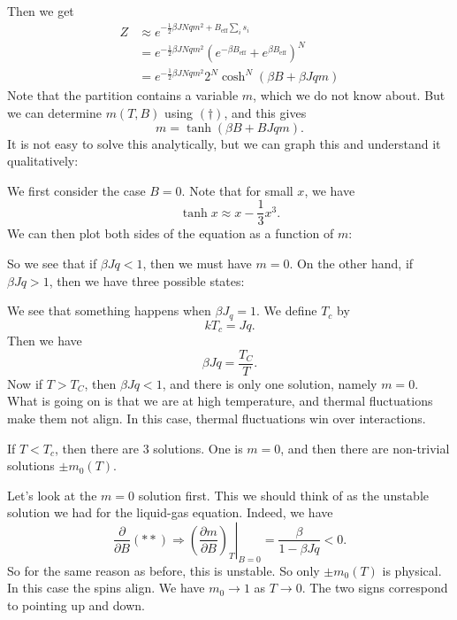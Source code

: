 \documentclass[a4paper]{article}
\begin{document}
Then we get
\begin{align*}
  Z &\approx e^{-\frac{1}{2} \beta J N q m^2 + B_{\mathrm{eff}}\sum_i s_i}\\
  &= e^{-\frac{1}{2} \beta J N q m^2} \left(e^{-\beta B_{\mathrm{eff}}} + e^{\beta B_{\mathrm{eff}}}\right)^N\\
  &= e^{-\frac{1}{2} \beta J N q m^2} 2^N \cosh^N (\beta B + \beta Jqm)
\end{align*}
Note that the partition contains a variable $m$, which we do not know about. But we can determine $m(T, B)$ using $(\dagger)$, and this gives
\[
  m = \tanh (\beta B + B Jqm).\tag{$**$}
\]
It is not easy to solve this analytically, but we can graph this and understand it qualitatively:

We first consider the case $B = 0$. Note that for small $x$, we have
\[
  \tanh x \approx x - \frac{1}{3} x^3.
\]
We can then plot both sides of the equation as a function of $m$:


So we see that if $\beta J q < 1$, then we must have $m = 0$. On the other hand, if $\beta J q > 1$, then we have three possible states:


We see that something happens when $\beta J_q = 1$. We define $T_c$ by
\[
  k T_c = Jq.
\]
Then we have
\[
  \beta Jq = \frac{T_C}{T}.
\]
Now if $T > T_C$, then $\beta J q < 1$, and there is only one solution, namely $m = 0$. What is going on is that we are at high temperature, and thermal fluctuations make them not align. In this case, thermal fluctuations win over interactions.

If $T < T_c$, then there are $3$ solutions. One is $m = 0$, and then there are non-trivial solutions $\pm m_0(T)$.

Let's look at the $m = 0$ solution first. This we should think of as the unstable solution we had for the liquid-gas equation. Indeed, we have
\[
  \frac{\partial}{\partial B} (**) \Longrightarrow \left.\left(\frac{\partial m}{\partial B}\right)_T\right|_{B = 0} = \frac{\beta}{1 - \beta J q} < 0.
\]
So for the same reason as before, this is unstable. So only $\pm m_0(T)$ is physical. In this case the spins align. We have $m_0 \to 1$ as $T \to 0$. The two signs correspond to pointing up and down.
\end{document}
